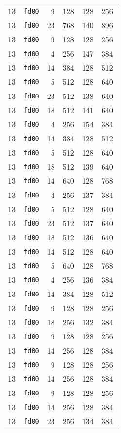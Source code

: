 \documentclass{article}
\begin{document}
\begin{table}[h!]
\begin{tabular}{llrrrl}
    13 & \texttt{fd00} & 9 & 128 & 128 & 256 \\
    13 & \texttt{fd00} & 23 & 768 & 140 & 896 \\
    13 & \texttt{fd00} & 9 & 128 & 128 & 256 \\
    13 & \texttt{fd00} & 4 & 256 & 147 & 384 \\
    13 & \texttt{fd00} & 14 & 384 & 128 & 512 \\
    13 & \texttt{fd00} & 5 & 512 & 128 & 640 \\
    13 & \texttt{fd00} & 23 & 512 & 138 & 640 \\
    13 & \texttt{fd00} & 18 & 512 & 141 & 640 \\
    13 & \texttt{fd00} & 4 & 256 & 154 & 384 \\
    13 & \texttt{fd00} & 14 & 384 & 128 & 512 \\
    13 & \texttt{fd00} & 5 & 512 & 128 & 640 \\
    13 & \texttt{fd00} & 18 & 512 & 139 & 640 \\
    13 & \texttt{fd00} & 14 & 640 & 128 & 768 \\
    13 & \texttt{fd00} & 4 & 256 & 137 & 384 \\
    13 & \texttt{fd00} & 5 & 512 & 128 & 640 \\
    13 & \texttt{fd00} & 23 & 512 & 137 & 640 \\
    13 & \texttt{fd00} & 18 & 512 & 136 & 640 \\
    13 & \texttt{fd00} & 14 & 512 & 128 & 640 \\
    13 & \texttt{fd00} & 5 & 640 & 128 & 768 \\
    13 & \texttt{fd00} & 4 & 256 & 136 & 384 \\
    13 & \texttt{fd00} & 14 & 384 & 128 & 512 \\
    13 & \texttt{fd00} & 9 & 128 & 128 & 256 \\
    13 & \texttt{fd00} & 18 & 256 & 132 & 384 \\
    13 & \texttt{fd00} & 9 & 128 & 128 & 256 \\
    13 & \texttt{fd00} & 14 & 256 & 128 & 384 \\
    13 & \texttt{fd00} & 9 & 128 & 128 & 256 \\
    13 & \texttt{fd00} & 14 & 256 & 128 & 384 \\
    13 & \texttt{fd00} & 9 & 128 & 128 & 256 \\
    13 & \texttt{fd00} & 14 & 256 & 128 & 384 \\
    13 & \texttt{fd00} & 23 & 256 & 134 & 384 \\

\end{tabular}
\end{table}
\end{document}
